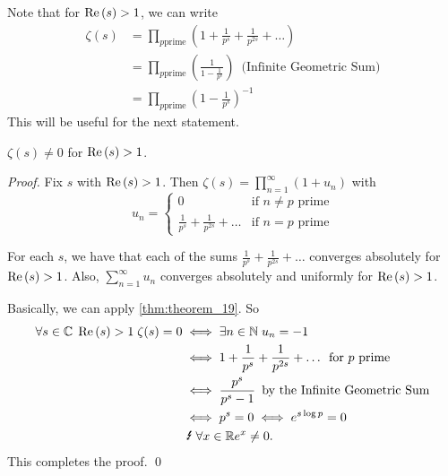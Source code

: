 \documentclass[notoc,notitlepage]{tufte-book}
\begin{document}
Note that for $\operatorname{Re}{(s)} > 1$, we can write
\begin{align*}
  \zeta (s) &= \prod_{p \text{prime}} \left(1 + \frac{1}{p^s} + \frac{1}{p^{2s}} + \hdots \right) \\
    &= \prod_{p \text{prime}} \left( \frac{1}{1 - \frac{1}{p^s}} \right) \enspace \text{(Infinite Geometric Sum)} \\
    &= \prod_{p \text{prime}} \left( 1 - \frac{1}{p^s} \right)^{-1}
\end{align*}
This will be useful for the next statement.

\begin{crly}\label{crly:corollary_for_theorem_19}
  $\zeta(s) \neq 0$ for $\operatorname{Re}{(s)} > 1$.
\end{crly}

\begin{proof}
  Fix $s$ with $\operatorname{Re}{(s)} > 1$. Then $\zeta(s) = \prod_{n=1}^{\infty} (1 + u_n)$ with
  \begin{equation*}
    u_n = \begin{cases}
      0 & \text{if } n \neq p \text{ prime} \\
      \frac{1}{p^s} + \frac{1}{p^{2s}} + \hdots & \text{if } n = p \text{ prime}
    \end{cases}
  \end{equation*}

  For each $s$, we have that each of the sums $\frac{1}{p^s} + \frac{1}{p^{2s}} + \hdots$ converges absolutely for $\operatorname{Re}{(s)} > 1$. Also, $\sum_{n=1}^{\infty} u_n$ converges absolutely and uniformly for $\operatorname{Re}{(s)} > 1$.

  Basically, we can apply \cref{thm:theorem_19}. So
  \begin{align*}
    \forall s \in \mathbb{C} \; \re{(s)} > 1 \; \zeta(s) = 0 &\iff \exists n \in \mathbb{N} \; u_n = -1 \\
      &\iff 1 + \frac{1}{p^s} + \frac{1}{p^{2s}} + \hdots \enspace \text{for } p \text{ prime} \\
      &\iff \frac{p^s}{p^s - 1} \enspace \text{by the Infinite Geometric Sum} \\
      &\iff p^s = 0 \iff e^{s \log p} = 0 \\
      &\text{ \Lightning } \; \forall x \in \mathbb{R} e^x \neq 0.
  \end{align*}
  This completes the proof. \qed
\end{proof}




\nobibliography*


\printindex
\end{document}
